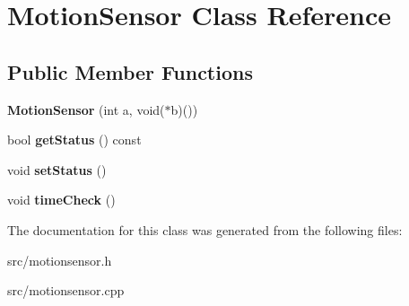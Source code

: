 \hypertarget{class_motion_sensor}{}\section{Motion\+Sensor Class Reference}
\label{class_motion_sensor}
\subsection*{Public Member Functions}
\begin{DoxyCompactItemize}
\item 
\hypertarget{class_motion_sensor_ab6dec78eb453fae1a7784bc53db8c319}{}{\bfseries Motion\+Sensor} (int a, void($\ast$b)())\label{class_motion_sensor_ab6dec78eb453fae1a7784bc53db8c319}

\item 
\hypertarget{class_motion_sensor_afaa71fb8b40e9745472be8ea502d4b7d}{}bool {\bfseries get\+Status} () const \label{class_motion_sensor_afaa71fb8b40e9745472be8ea502d4b7d}

\item 
\hypertarget{class_motion_sensor_a6c5610df99f05c2899489a7dd4e03c46}{}void {\bfseries set\+Status} ()\label{class_motion_sensor_a6c5610df99f05c2899489a7dd4e03c46}

\item 
\hypertarget{class_motion_sensor_a02dfae657132e2d4cedce9dcd63739a0}{}void {\bfseries time\+Check} ()\label{class_motion_sensor_a02dfae657132e2d4cedce9dcd63739a0}

\end{DoxyCompactItemize}


The documentation for this class was generated from the following files\+:\begin{DoxyCompactItemize}
\item 
src/motionsensor.\+h\item 
src/motionsensor.\+cpp\end{DoxyCompactItemize}
